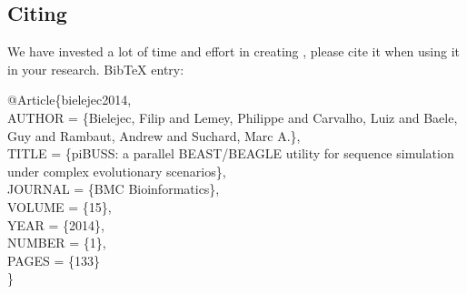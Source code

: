 \subsection{Citing {\bussname}}
We have invested a lot of time and effort in creating {\bussname}, please cite it when using it in your research. BibTeX entry:


\begin{code}
\footnotesize{
@Article\{bielejec2014, \\
  AUTHOR = \{Bielejec, Filip and Lemey, Philippe and Carvalho, Luiz
and Baele, Guy and Rambaut, Andrew and Suchard, Marc A.\}, \\
  TITLE = \{piBUSS: a parallel BEAST/BEAGLE utility for sequence simulation
under complex evolutionary scenarios\}, \\
  JOURNAL = \{BMC Bioinformatics\}, \\
  VOLUME = \{15\}, \\
  YEAR = \{2014\}, \\
  NUMBER = \{1\}, \\
  PAGES = \{133\} \\
\}
}
\end{code}
